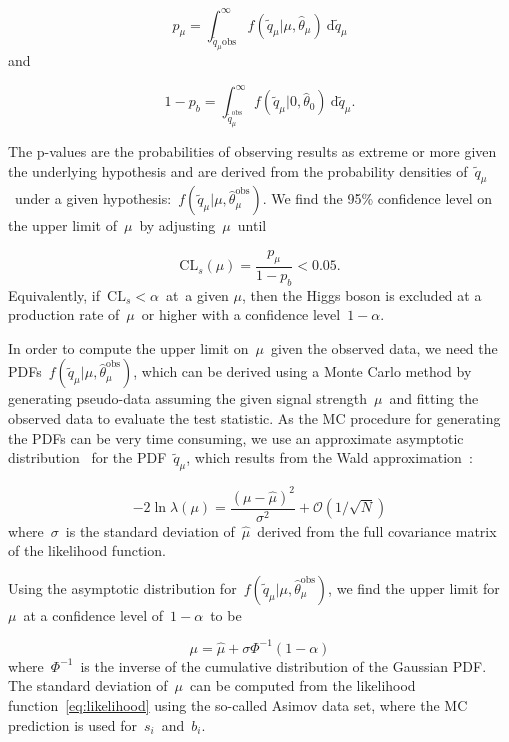 \begin{equation}
p_{\mu} = \int_{\tilde{q}_{\mu}{\mathrm{obs}}}^\infty f(\tilde{q}_{\mu} | \mu, \hat{\theta}_{\mu})\ \mathrm{d}\tilde{q}_\mu
\end{equation}
and

\begin{equation}
1 - p_b = \int_{\tilde{q}_{\mu}^{\mathrm{obs}}}^\infty f(\tilde{q}_{\mu} | 0, \hat{\theta}_0)\ \mathrm{d}\tilde{q}_{\mu}.
\end{equation}

The p-values are the probabilities of observing results as extreme or more given the underlying hypothesis and are derived from the probability densities of~$\tilde{q}_{\mu}$~under a given hypothesis:~$f(\tilde{q}_\mu | \mu, \hat{\theta}_\mu^{\mathrm{obs}})$. We find the 95\% confidence level on the upper limit of~$\mu$~by adjusting~$\mu$~until

\begin{equation}
\mathrm{CL}_s(\mu) = \frac{p_\mu}{1 - p_b} < 0.05.
\end{equation}
Equivalently, if~$\mathrm{CL}_s < \alpha$~at~a given $\mu$, then the Higgs boson is excluded at a production rate of~$\mu$~or higher with a confidence level~$1 - \alpha$.

In order to compute the upper limit on~$\mu$~given the observed data, we need the PDFs~$f(\tilde{q}_\mu | \mu, \hat{\theta}_\mu^{\mathrm{obs}})$, which can be derived using a Monte Carlo method by generating pseudo-data assuming the given signal strength~$\mu$~and fitting the observed data to evaluate the test statistic. As the MC procedure for generating the PDFs can be very time consuming, we use an approximate asymptotic distribution~\cite{Cowan:2010js} for the PDF~$\tilde{q}_\mu$, which results from the Wald approximation~\cite{wald1943tests}:

\begin{equation}
-2 \ln{\lambda(\mu)} = \frac{(\mu - \hat{\mu})^2}{\sigma^2}+ \mathcal{O}(1/\sqrt{N})
\end{equation}
where~$\sigma$~is the standard deviation of~$\hat{\mu}$~derived from the full covariance matrix of the likelihood function.

Using the asymptotic distribution for~$f(\tilde{q}_\mu | \mu, \hat{\theta}_\mu^{\mathrm{obs}})$, we find the upper limit for~$\mu$~at a confidence level of~$1 - \alpha$~to be

\begin{equation}
\mu = \hat{\mu} + \sigma \Phi^{-1}(1 - \alpha)
\end{equation}
where~$\Phi^{-1}$~is the inverse of the cumulative distribution of the Gaussian PDF. The standard deviation of~$\mu$~can be computed from the likelihood function~\cref{eq:likelihood} using the so-called Asimov data set, where the MC prediction is used for~$s_i$~and~$b_i$.

